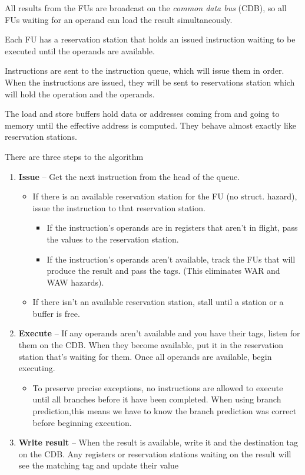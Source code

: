 \documentclass{article}
\begin{document}
All results from the FUs are broadcast on the \textit{common data bus} (CDB), so all FUs waiting for an operand can load the result simultaneously. 

Each FU has a reservation station that holds an issued instruction waiting to be executed until the operands are available. 

Instructions are sent to the instruction queue, which will issue them in order. When the instructions are issued, they will be sent to reservations station which will hold the operation and the operands. 

The load and store buffers hold data or addresses coming from and going to memory until the effective address is computed. They behave almost exactly like reservation stations.




There are three steps to the algorithm

\begin{enumerate}
\item \textbf{Issue} -- Get the next instruction from the head of the queue. 

\begin{itemize}
\item If there is an available reservation station for the FU (no struct. hazard), issue the instruction to that reservation station. 

\begin{itemize}
\item If the instruction's operands are in registers that aren't in flight, pass the values to the reservation station.

\item If the instruction's operands aren't available, track the FUs that will produce the result and pass the tags. (This eliminates WAR and WAW hazards).
\end{itemize}

\item If there isn't an available reservation station, stall until a station or a buffer is free.
\end{itemize}

\item \textbf{Execute} -- If any operands aren't available and you have their tags, listen for them on the CDB. When they become available, put it in the reservation station that's waiting for them. Once all operands are available, begin executing.

\begin{itemize}
\item To preserve precise exceptions, no instructions are allowed to execute until all branches before it have been completed. When using branch prediction,this means we have to know the branch prediction was correct before beginning execution.
\end{itemize}

\item \textbf{Write result} -- When the result is available, write it and the destination tag on the CDB. Any registers or reservation stations waiting on the result will see the matching tag and update their value

\end{enumerate}
\end{document}
